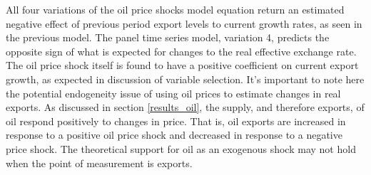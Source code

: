 \documentclass[10pt,letterpaper]{article}
\begin{document}
All four variations of the oil price shocks model equation return an estimated negative effect of previous period export levels to current growth rates, as seen in the previous model. The panel time series model, variation 4, predicts the opposite sign of what is expected for changes to the real effective exchange rate. The oil price shock itself is found to have a positive coefficient on current export growth, as expected in discussion of variable selection. It's important to note here the potential endogeneity issue of using oil prices to estimate changes in real exports. As discussed in section \ref{results_oil}, the supply, and therefore exports, of oil respond positively to changes in price. That is, oil exports are increased in response to a positive oil price shock and decreased in response to a negative price shock. The theoretical support for oil as an exogenous shock may not hold when the point of measurement is exports. 
\end{document}
